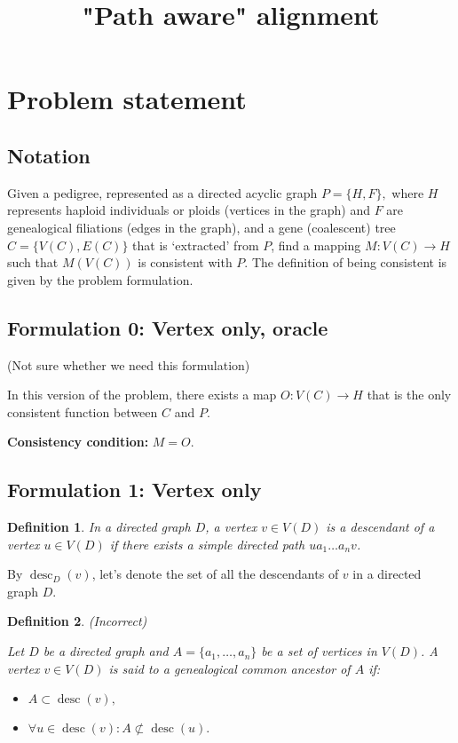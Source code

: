 \documentclass[14pt]{extarticle}
\DeclareMathOperator{\desc}{desc}
\newtheorem{definition}{Definition}
\begin{document}
	
	
\title{"Path aware" alignment}
\date{}


\section{Problem statement}

\subsection{Notation}

Given a pedigree, represented as a directed acyclic graph $P = \{H, F\},$ where $H$ represents haploid individuals or ploids (vertices in the graph) and $F$ are genealogical filiations (edges in the graph), and a gene (coalescent) tree $C = \{V(C), E(C)\}$ that is `extracted' from $P$, find a mapping $M: V(C) \rightarrow H$ such that $M(V(C))$ is consistent with $P$. The definition of being consistent is given by the problem formulation.


\subsection{Formulation 0: Vertex only, oracle} (Not sure whether we need this formulation)

In this version of the problem, there exists a map $O: V(C) \rightarrow H$ that is the only consistent function between $C$ and $P$.

\textbf{Consistency condition:}  $M = O$.

\subsection{Formulation 1: Vertex only} 

\begin{definition}
	In a directed graph $D$, a vertex $v \in V(D)$ is a descendant of a vertex $u \in V(D)$ if there exists a simple directed path $ua_1 \ldots a_nv$.
\end{definition}

By $\desc_D(v)$, let's denote the set of all the descendants of $v$ in a directed graph $D$.

\begin{definition} (Incorrect)
	
	Let $D$ be a directed graph and $A = \{a_1, \ldots, a_n\}$ be a set of vertices in $V(D)$. A vertex $v \in V(D)$ is said to a genealogical common ancestor of $A$ if:
	
	\begin{itemize}
		\item 
		$A \subset \desc(v),$
		\item 
		$\forall u \in \desc(v): A \not \subset \desc(u).$
	\end{itemize}
	
\end{definition}
\end{document}
